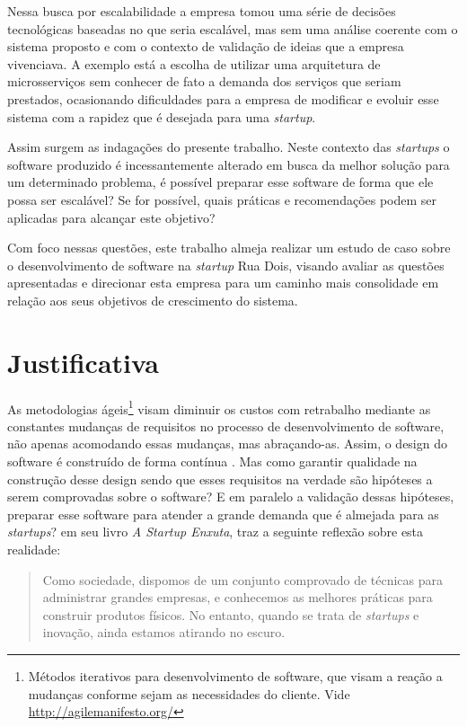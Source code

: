 Nessa busca por escalabilidade a empresa tomou uma série de decisões tecnológicas
baseadas no que seria escalável, mas sem uma análise coerente com o sistema
proposto e com o contexto de validação de ideias que a empresa vivenciava.
A exemplo está a escolha de utilizar uma arquitetura de microsserviços sem conhecer
de fato a demanda dos serviços que seriam prestados, ocasionando dificuldades para
a empresa de modificar e evoluir esse sistema com a rapidez que é desejada para uma
\textit{startup}.

Assim surgem as indagações do presente trabalho. Neste contexto das \textit{startups}
o software produzido é incessantemente alterado em busca da melhor solução para um
determinado problema, é possível preparar esse software de forma que ele possa ser
escalável? Se for possível, quais práticas e recomendações podem ser aplicadas para
alcançar este objetivo?

Com foco nessas questões, este trabalho almeja realizar um estudo de caso sobre o
desenvolvimento de software na \textit{startup} Rua Dois, visando avaliar as questões
apresentadas e direcionar esta empresa para um caminho mais consolidade em relação
aos seus objetivos de crescimento do sistema.

\section{Justificativa}

As metodologias ágeis\footnote{Métodos iterativos para desenvolvimento de software,
que visam a reação a mudanças conforme sejam as necessidades do cliente. Vide
\url{http://agilemanifesto.org/}} visam diminuir os custos com retrabalho mediante as
constantes mudanças de requisitos no processo de desenvolvimento de software,
não apenas acomodando essas mudanças, mas abraçando-as. Assim, o design do
software é construído de forma contínua \cite{AgileSoftwareInnovation}.
Mas como garantir qualidade na construção desse design sendo que esses requisitos
na verdade são hipóteses a serem comprovadas sobre o software? E em paralelo
a validação dessas hipóteses, preparar esse software para atender a grande
demanda que é almejada para as \textit{startups}? 
em seu livro \textit{A Startup Enxuta}, traz a seguinte reflexão sobre esta
realidade:

  \begin{quotation}
    Como sociedade, dispomos de um conjunto comprovado de técnicas para
    administrar grandes empresas, e conhecemos as melhores práticas para
    construir produtos físicos. No entanto, quando se trata de \textit{startups}
    e inovação, ainda estamos atirando no escuro.
  \end{quotation}

